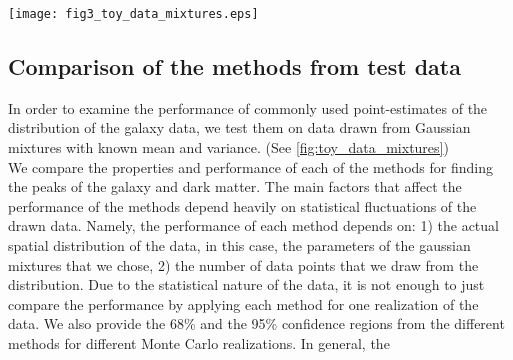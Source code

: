 \begin{figure*}
	\texttt{[image: fig3\_toy\_data\_mixtures.eps]}
	\caption{Comparison of peak finding performances of different methods by
		drawing data point from known number of Gaussian mixture models. 
		Panels from the top row contain data drawn from a single Gaussian mixture. The
	panels from the middle row contain data from one dominant and one
	subdominant Gaussian mixtures. 
	The panels from the bottom row contain data drawn from one dominate Gaussian
	mixture and two subdominant Gaussian mixtures. 
	Due to the statistical nature of this exercise, we performed many samples to
	create the (68\% and 95\%) confidence contours of the estimates in the middle
	column. The rightmost column shows how the size (median contour radius) 
	of the confidence regions vary as a
	function of the number of drawn data points from the Gaussian mixtures. 
	From the middle and the rightmost
	column, we can tell that the KDE peak estimate is the most accurate but less
	precise. For the bottom right plot, there is an outlier for the shrinking 
	aperture method for 500 data
	points. The outlier shows how the shrinking aperture method can have
	radical behavior when there are substructures in the data.	
		\label{fig:toy_data_mixtures}}
\end{figure*}



\subsection{Comparison of the methods from test data}
In order to examine the performance of commonly used point-estimates of the
distribution of the galaxy data, we test them on data drawn from Gaussian mixtures with
known mean and variance. (See \ref{fig:toy_data_mixtures})\\
We compare the properties and performance of each of the
methods for finding the peaks of the galaxy and dark matter. 
The main factors that affect the performance of the methods depend heavily on
statistical fluctuations of the drawn data. Namely, the performance of each
method depends on: 1) the
actual spatial distribution of the data, in this case, the parameters of the
gaussian mixtures that we chose, 2) the number of data points that we draw from 
the distribution.
Due to the statistical nature of the data, it is not enough to just
compare the performance by applying each method for one realization of the
data. We also provide the 68\% and the 95\% confidence regions from the
different methods for different Monte Carlo realizations.
In general, the 


